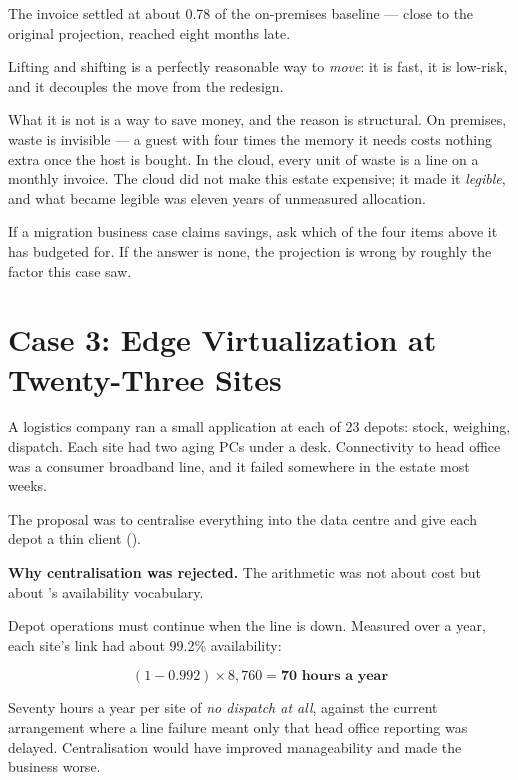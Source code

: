 The invoice settled at about 0.78 of the on-premises baseline --- close to the
original projection, reached eight months late.

\begin{conceptbox}
Lifting and shifting is a perfectly reasonable way to \emph{move}: it is fast,
it is low-risk, and it decouples the move from the redesign.

\smallskip
What it is not is a way to save money, and the reason is structural. On
premises, waste is invisible --- a guest with four times the memory it needs
costs nothing extra once the host is bought. In the cloud, every unit of waste
is a line on a monthly invoice. The cloud did not make this estate expensive;
it made it \emph{legible}, and what became legible was eleven years of
unmeasured allocation.

\smallskip
If a migration business case claims savings, ask which of the four items above
it has budgeted for. If the answer is none, the projection is wrong by roughly
the factor this case saw.
\end{conceptbox}

\section{Case 3: Edge Virtualization at Twenty-Three Sites}

\begin{conceptbox}
A logistics company ran a small application at each of 23 depots: stock,
weighing, dispatch. Each site had two aging PCs under a desk. Connectivity to
head office was a consumer broadband line, and it failed somewhere in the
estate most weeks.

\smallskip
The proposal was to centralise everything into the data centre and give each
depot a thin client ().
\end{conceptbox}

\textbf{Why centralisation was rejected.} The arithmetic was not about cost but
about 's availability vocabulary.

Depot operations must continue when the line is down. Measured over a year,
each site's link had about 99.2\% availability:

\[ (1 - 0.992) \times 8{,}760 = \mathbf{70 \text{ hours a year}} \]

Seventy hours a year per site of \emph{no dispatch at all}, against the current
arrangement where a line failure meant only that head office reporting was
delayed. Centralisation would have improved manageability and made the business
worse.

